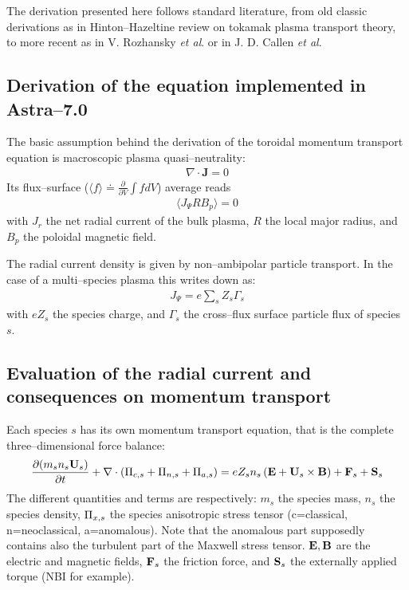 The derivation presented here follows standard literature, from old classic derivations as in Hinton--Hazeltine review on tokamak plasma transport theory, to more recent as in V. Rozhansky {\it et al}. or in J. D. Callen {\it et al}.
%
\subsection{Derivation of the equation implemented in Astra--7.0}
The basic assumption behind the derivation of the toroidal momentum transport equation is macroscopic plasma quasi--neutrality:
\begin{eqnarray}
\nabla \cdot \mathbf{J} = 0
\label{qneutraldivjeq0}
\end{eqnarray}
Its flux--surface ($\displaystyle \langle f \rangle \doteq \frac{\partial}{\partial{V}}\int{f dV}$) average reads 
\begin{eqnarray}
\langle J_\Psi R B_p \rangle=0
\label{qneutraldivjeq0fsa}
\end{eqnarray}
with $J_r$ the 
net radial current of the bulk plasma, $R$ the local major radius, and $B_p$ the
poloidal magnetic field.

The radial current density is given by non--ambipolar particle transport. In the case of a multi--species plasma this writes down as:
\begin{eqnarray}
J_\Psi =e\sum_s Z_s \Gamma_s 
\label{jpsimultispecpartsum}
\end{eqnarray}
with $e Z_s$ the species charge, and $\Gamma_s$ the cross--flux surface particle flux of species $s$. 
%
\subsection{Evaluation of the radial current and consequences on momentum transport}
Each species $s$ has its own momentum transport equation, that is the complete three--dimensional force balance:
\begin{eqnarray}
\frac{\partial(m_s n_s\mathbf{U}_s)}{\partial{t}}+\nabla\cdot\left(\Pi_{c,s}
+\Pi_{n,s}+\Pi_{a,s}\right)=e Z_s n_s \left(\mathbf{E}+\mathbf{U}_s\times\mathbf{B}\right) +\mathbf{F}_s+\mathbf{S}_s
\label{momtranspeq3d}
\end{eqnarray}
The different quantities and terms are respectively: $m_s$ the species mass, $n_s$ the species density, $\Pi_{x,s}$ 
the species anisotropic stress tensor (c=classical, n=neoclassical, a=anomalous). Note that the anomalous part 
supposedly contains also the turbulent part of the Maxwell stress tensor. $\mathbf{E},\mathbf{B}$ are the electric and magnetic 
fields, $\mathbf{F}_s$ the friction force, and $\mathbf{S}_s$ the externally applied torque (NBI for example).

